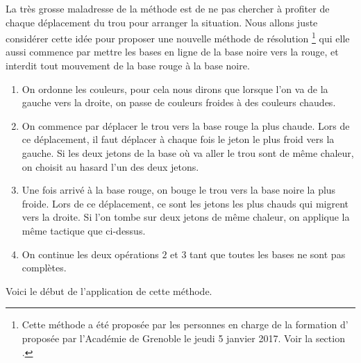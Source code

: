 La très grosse maladresse de la méthode  est de ne pas chercher à profiter de chaque déplacement du trou pour arranger la situation. Nous allons juste considérer cette idée pour proposer une nouvelle méthode de résolution
\footnote{
    Cette méthode a été proposée par les personnes en charge de la formation d' proposée par l'Académie de Grenoble le jeudi 5 janvier 2017. Voir la section .
}
qui elle aussi commence par mettre les bases en ligne de la base noire vers la rouge, et interdit tout mouvement de la base rouge à la base noire.

\begin{enumerate}
    \item On ordonne les couleurs, pour cela nous dirons que lorsque l'on va de la gauche vers la droite, on passe de couleurs froides à des couleurs chaudes.

    \item On commence par déplacer le trou vers la base rouge la plus chaude. Lors de ce déplacement, il faut déplacer à chaque fois le jeton le plus froid vers la gauche. Si les deux jetons de la base où va aller le trou sont de même chaleur, on choisit au hasard l'un des deux jetons.

    \item Une fois arrivé à la base rouge, on bouge le trou vers la base noire la plus froide. Lors de ce déplacement, ce sont les jetons les plus chauds qui migrent vers la droite. Si l'on tombe sur deux jetons de même chaleur, on applique la même tactique que ci-dessus.

    \item On continue les deux opérations $2$ et $3$ tant que toutes les bases ne sont pas complètes.
\end{enumerate}


Voici le début de l'application de cette méthode.

\medskip

